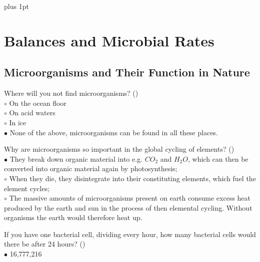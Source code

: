 \documentclass[]{beamer}
\begin{document}
\parskip=1cm plus 1pt
\section{Balances and Microbial Rates}

\subsection{Microorganisms and Their Function in Nature}
\setcounter{questions}{0}
\begin{frame}[shrink] {}
\addtocounter{questions}{1}
\color{blue}
Where will you not find microorganisms? ()\\
\color{black}
\setlength{\parindent}{-0.4cm}
{\color{red}$\circ$} On the ocean floor \\
{\color{red}$\circ$} On acid waters  \\
{\color{red}$\circ$} In ice  \\
{\color{red}$\bullet$} None of the above, microorganisms can be found in all these places. \\
\end{frame}

\begin{frame}[shrink] {}
\addtocounter{questions}{1}
\color{blue}
Why are microorganisms so important in the global cycling of elements? ()\\
\color{black}
\setlength{\parindent}{-0.4cm}
{\color{red}$\bullet$} They break down organic material into e.g. $CO_2$ and $H_2O$, which can
then be converted into organic material again by photosynthesis;\\
{\color{red}$\circ$} When they die, they disintegrate into their constituting elements,
which fuel the element cycles;\\
{\color{red}$\circ$} The massive amounts of microorganisms present on earth
consume excess heat produced by the earth and sun in the process of
then elemental cycling. Without organisms the earth would therefore heat up.
\end{frame}

\begin{frame}[shrink] {}
\addtocounter{questions}{1}
\color{blue}
If you have one bacterial cell, dividing every hour, how many bacterial
cells would there be after 24 hours? ()\\
\color{black}
\setlength{\parindent}{-0.4cm}
{\color{red}$\bullet$} 16,777,216
\end{frame}
\end{document}
